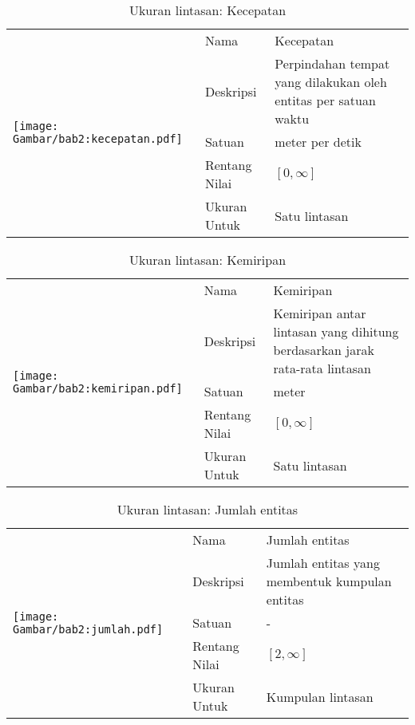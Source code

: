 \begin{table}[h!]
    \centering
    \caption{Ukuran lintasan: Kecepatan}
    \begin{tabular}{|m{4cm}|l|p{8.5cm}|} 
        \hline
        \multirow{5}{*}{
            \texttt{[image: Gambar/bab2:kecepatan.pdf]}
        } & Nama & Kecepatan \\ 
        \cline{2-3}
        & Deskripsi & Perpindahan tempat yang dilakukan oleh entitas per satuan waktu                    \\ 
        \cline{2-3}
        & Satuan & meter per detik                   \\ 
        \cline{2-3}
        & Rentang Nilai & $[0, \infty]$                    \\ 
        \cline{2-3}
        & Ukuran Untuk & Satu lintasan                    \\
        \hline
    \end{tabular}
    \label{bab2:ukuran-kecepatan}
\end{table}

\begin{table}[h!]
    \centering
    \caption{Ukuran lintasan: Kemiripan}
    \begin{tabular}{|m{4cm}|l|p{8.5cm}|} 
        \hline
        \multirow{5}{*}{
            \texttt{[image: Gambar/bab2:kemiripan.pdf]}
        } & Nama & Kemiripan \\ 
        \cline{2-3}
        & Deskripsi & Kemiripan antar lintasan yang dihitung berdasarkan jarak rata-rata lintasan                     \\ 
        \cline{2-3}
        & Satuan & meter                   \\ 
        \cline{2-3}
        & Rentang Nilai & $[0, \infty]$                    \\ 
        \cline{2-3}
        & Ukuran Untuk & Satu lintasan                    \\
        \hline
    \end{tabular}
    \label{bab2:ukuran-kemiripan}
\end{table}

\begin{table}[h!]
    \centering
    \caption{Ukuran lintasan: Jumlah entitas}
    \begin{tabular}{|m{4cm}|l|p{8.5cm}|} 
        \hline
        \multirow{5}{*}{
            \texttt{[image: Gambar/bab2:jumlah.pdf]}
        } & Nama & Jumlah entitas \\ 
        \cline{2-3}
        & Deskripsi & Jumlah entitas yang membentuk kumpulan entitas                     \\ 
        \cline{2-3}
        & Satuan & -                   \\ 
        \cline{2-3}
        & Rentang Nilai & $[2, \infty]$                    \\ 
        \cline{2-3}
        & Ukuran Untuk & Kumpulan lintasan                    \\
        \hline
    \end{tabular}
    \label{bab2:ukuran-jumlah}
\end{table}

